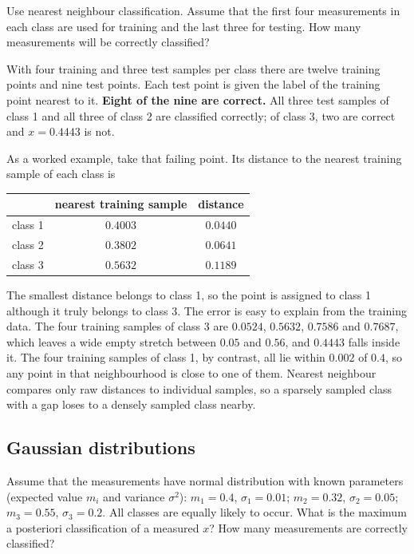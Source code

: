 \documentclass[11pt]{article}
\begin{document}
\begin{question}
Use nearest neighbour classification. Assume that the first four measurements
in each class are used for training and the last three for testing. How many
measurements will be correctly classified?
\end{question}

With four training and three test samples per class there are twelve training
points and nine test points. Each test point is given the label of the
training point nearest to it. \textbf{Eight of the nine are correct.} All
three test samples of class 1 and all three of class 2 are classified
correctly; of class 3, two are correct and $x = 0.4443$ is not.

As a worked example, take that failing point. Its distance to the nearest
training sample of each class is

\begin{table}[H]
    \centering
    \begin{tabular}{lcc}
        \toprule
        & nearest training sample & distance \\
        \midrule
        class 1 & $0.4003$ & $\mathbf{0.0440}$ \\
        class 2 & $0.3802$ & $0.0641$ \\
        class 3 & $0.5632$ & $0.1189$ \\
        \bottomrule
    \end{tabular}
\end{table}

The smallest distance belongs to class 1, so the point is assigned to class 1
although it truly belongs to class 3. The error is easy to explain from the
training data. The four training samples of class 3 are $0.0524$, $0.5632$,
$0.7586$ and $0.7687$, which leaves a wide empty stretch between $0.05$ and
$0.56$, and $0.4443$ falls inside it. The four training samples of class 1, by
contrast, all lie within $0.002$ of $0.4$, so any point in that neighbourhood
is close to one of them. Nearest neighbour compares only raw distances to
individual samples, so a sparsely sampled class with a gap loses to a densely
sampled class nearby.

\subsection{Gaussian distributions}

\begin{question}
Assume that the measurements have normal distribution with known parameters
(expected value $m_i$ and variance $\sigma^2$): $m_1 = 0.4$,
$\sigma_1 = 0.01$; $m_2 = 0.32$, $\sigma_2 = 0.05$; $m_3 = 0.55$,
$\sigma_3 = 0.2$. All classes are equally likely to occur. What is the maximum
a posteriori classification of a measured $x$? How many measurements are
correctly classified?
\end{question}
\end{document}
